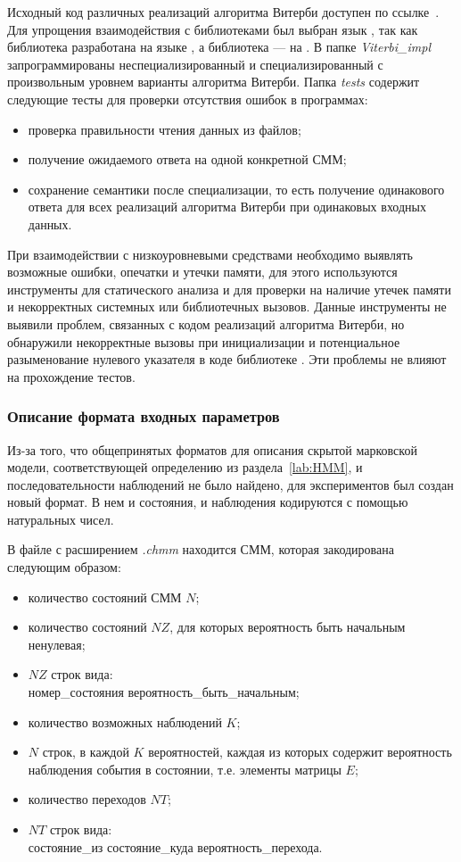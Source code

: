 Исходный код различных реализаций алгоритма Витерби доступен 
по ссылке~\cite{repo}.
Для упрощения взаимодействия с библиотеками был выбран язык 
\CPP, так как библиотека  
разработана на языке , а библиотека  --- на \CPP.
В папке \emph{Viterbi\_impl} запрограммированы
неспециализированный и специализированный с произвольным 
уровнем варианты алгоритма Витерби.
Папка \emph{tests} содержит следующие тесты для проверки 
отсутствия ошибок в программах:
\begin{itemize}
	\item проверка правильности чтения данных из файлов;
	\item получение ожидаемого ответа на одной конкретной СММ;
	\item сохранение семантики после специализации, то есть 
	получение одинакового ответа для всех реализаций 
	алгоритма Витерби при одинаковых входных данных.
\end{itemize} 
При взаимодействии с низкоуровневыми средствами
необходимо выявлять возможные ошибки, опечатки и утечки 
памяти, для этого используются инструменты  
для статического анализа и  для проверки на 
наличие утечек памяти и некорректных системных или 
библиотечных вызовов.
Данные инструменты не выявили проблем, связанных с кодом 
реализаций алгоритма Витерби, но обнаружили некорректные 
вызовы при инициализации  и потенциальное 
разыменование нулевого указателя в коде библиотеке .
Эти проблемы не влияют на прохождение тестов.

\subsubsection{Описание формата входных параметров}
\label{lab:formats}
Из-за того, что общепринятых форматов для описания скрытой 
марковской модели, соответствующей определению из 
раздела~\ref{lab:HMM}, и последовательности наблюдений не 
было найдено, для экспериментов был создан новый формат.
В нем и состояния, и наблюдения кодируются с помощью 
натуральных чисел.

В файле с расширением \emph{.chmm} находится СММ, которая закодирована следующим образом:
\begin{itemize}
	\item количество состояний СММ $N$;
	\item количество состояний $NZ$, для которых вероятность быть начальным ненулевая;
	\item $NZ$ строк вида:\\ 
	номер\_состояния вероятность\_быть\_начальным;
	\item количество возможных наблюдений $K$;
	\item $N$ строк, в каждой $K$ вероятностей, каждая из которых содержит вероятность наблюдения события в состоянии, т.е. элементы матрицы $E$;
	\item количество переходов $NT$;
	\item $NT$ строк вида:\\ состояние\_из состояние\_куда вероятность\_перехода.
\end{itemize}

